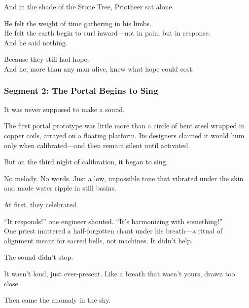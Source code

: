 \documentclass[9pt]{article}
\begin{document}
\vspace{0.5em}
And in the shade of the Stone Tree, Priotheer sat alone.

\vspace{0.5em}
He felt the weight of time gathering in his limbs.\\
He felt the earth begin to curl inward---not in pain, but in response.\\
And he said nothing.

\vspace{0.5em}
Because they still had hope.\\
And he, more than any man alive, knew what hope could cost.


\newpage


\subsubsection*{Segment 2: The Portal Begins to Sing}

It was never supposed to make a sound.

\vspace{0.5em}
The first portal prototype was little more than a circle of bent steel wrapped in copper coils, arrayed on a floating platform. Its designers claimed it would hum only when calibrated---and then remain silent until activated.

\vspace{0.5em}
But on the third night of calibration, it began to sing.

\vspace{0.5em}
No melody. No words. Just a low, impossible tone that vibrated under the skin and made water ripple in still basins.

\vspace{0.5em}
At first, they celebrated.

\vspace{0.5em}
``It responds!'' one engineer shouted. ``It’s harmonizing with something!''\\
One priest muttered a half-forgotten chant under his breath---a ritual of alignment meant for sacred bells, not machines. It didn’t help.

\vspace{0.5em}
The sound didn’t stop.

\vspace{0.5em}
It wasn’t loud, just ever-present. Like a breath that wasn’t yours, drawn too close.

\vspace{0.5em}
Then came the anomaly in the sky.
\end{document}

